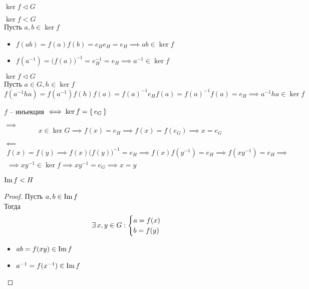 \begin{props}[ядра]
	\item $ \ker f \vartriangleleft G $
	\begin{iproof}
		\item $ \ker f < G $ \\
		Пусть $ a, b \in \ker f $
		\begin{itemize}
			\item $ f(ab) = f(a)f(b) = e_He_H = e_H \implies ab \in \ker f $
			\item $ f(a^{-1}) = \big( f(a) \big)^{-1} = e_H^{-1} = e_H \implies a^{-1} \in \ker f $
		\end{itemize}
		\item $ \ker f \vartriangleleft G $ \\
		Пусть $ a \in G, h \in \ker f $
		$$ f(a^{-1}ha) = f(a^{-1})f(h)f(a) = f(a)^{-1}e_Hf(a) = f(a)^{-1}f(a) = e_H \implies a^{-1}ha \in \ker f $$
	\end{iproof}
	\item $ f $ -- инъекция $ \iff \ker f = \set{e_G} $
	\begin{iproof}
		\item $ \implies $
		$$ x \in \ker G \implies f(x) = e_H \implies f(x) = f(e_G) \implies x = e_G $$
		\item $ \impliedby $
		\begin{multline*}
			f(x) = f(y) \implies f(x) \big( f(y) \big)^{-1} = e_H \implies f(x)f(y^{-1}) = e_H \implies f(xy^{-1}) = e_H \implies \\
			\implies xy^{-1} \in \ker f \implies xy^{-1} = e_G \implies x = y
		\end{multline*}
	\end{iproof}
\end{props}

\begin{property}[образа]
	$ \operatorname{Im} f < H $
\end{property}

\begin{proof}
	Пусть $ a, b \in \operatorname{Im} f $ \\
	Тогда
	$$ \exists\, x, y \in G :
	\begin{cases}
		a = f(x) \\
		b = f(y)
	\end{cases} $$
	\begin{itemize}
		\item $ ab = f(xy) \in \operatorname{Im} f $
		\item $ a^{-1} = f(x^{-1}) \in \operatorname{Im} f $
	\end{itemize}
\end{proof}

